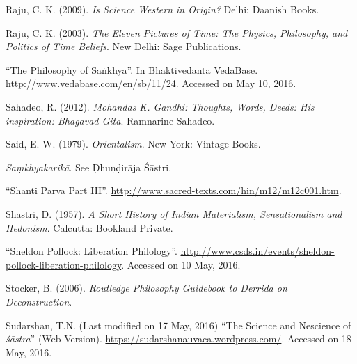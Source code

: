 \begin{thebibliography}{99}
Raju, C. K. (2009). {\sl Is Science Western in Origin?} Delhi: Daanish Books.

Raju, C. K. (2003). {\sl The Eleven Pictures of Time: The Physics, Philosophy, and Politics of Time Beliefs}. New Delhi: Sage Publications.

``The Philosophy of Sāṅkhya''. In Bhaktivedanta VedaBase. \url{http://www.vedabase.com/en/sb/11/24}. Accessed on May 10, 2016.

Sahadeo, R. (2012). {\sl Mohandas K. Gandhi: Thoughts, Words, Deeds: His inspiration: Bhagavad-Gita}. Ramnarine Sahadeo.

Said, E. W. (1979). {\sl Orientalism}. New York: Vintage Books.

{\sl Saṃkhyakarikā}. See Ḍhuṇḍirāja Śāstri.

``Shanti Parva Part III''. \url{http://www.sacred-texts.com/hin/m12/m12c001.htm}. 

Shastri, D. (1957). {\sl A Short History of Indian Materialism, Sensationalism and Hedonism}. Calcutta: Bookland Private.

``Sheldon Pollock: Liberation Philology''. \url{http://www.csds.in/events/sheldon-pollock-liberation-philology}. Accessed on 10 May, 2016.

Stocker, B. (2006). {\sl Routledge Philosophy Guidebook to Derrida on Deconstruction}. 

Sudarshan, T.N. (Last modified on 17 May, 2016) ``The Science and Nescience of {\sl śāstra}'' (Web Version). \url{https://sudarshanauvaca.wordpress.com/}. Accessed on 18 May, 2016.
\end{thebibliography}

\theendnotes
